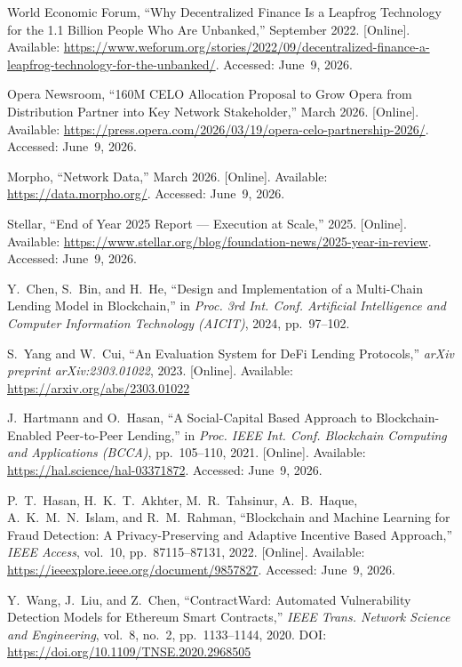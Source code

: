 \documentclass[12pt, a4paper]{report}
\begin{document}
{\begin{enumerate}[label={[\arabic*]}]
\item World Economic Forum, ``Why Decentralized Finance Is a Leapfrog Technology for the 1.1 Billion People Who Are Unbanked,'' September 2022. [Online]. Available: \url{https://www.weforum.org/stories/2022/09/decentralized-finance-a-leapfrog-technology-for-the-unbanked/}. Accessed: June~9, 2026.

\item Opera Newsroom, ``160M CELO Allocation Proposal to Grow Opera from Distribution Partner into Key Network Stakeholder,'' March 2026. [Online]. Available: \url{https://press.opera.com/2026/03/19/opera-celo-partnership-2026/}. Accessed: June~9, 2026.

\item Morpho, ``Network Data,'' March 2026. [Online]. Available: \url{https://data.morpho.org/}. Accessed: June~9, 2026.

\item Stellar, ``End of Year 2025 Report --- Execution at Scale,'' 2025. [Online]. Available: \url{https://www.stellar.org/blog/foundation-news/2025-year-in-review}. Accessed: June~9, 2026.

\item Y.~Chen, S.~Bin, and H.~He, ``Design and Implementation of a Multi-Chain Lending Model in Blockchain,'' in \textit{Proc. 3rd Int. Conf. Artificial Intelligence and Computer Information Technology (AICIT)}, 2024, pp.~97--102.

\item S.~Yang and W.~Cui, ``An Evaluation System for DeFi Lending Protocols,'' \textit{arXiv preprint arXiv:2303.01022}, 2023. [Online]. Available: \url{https://arxiv.org/abs/2303.01022}

\item J.~Hartmann and O.~Hasan, ``A Social-Capital Based Approach to Blockchain-Enabled Peer-to-Peer Lending,'' in \textit{Proc. IEEE Int. Conf. Blockchain Computing and Applications (BCCA)}, pp.~105--110, 2021. [Online]. Available: \url{https://hal.science/hal-03371872}. Accessed: June~9, 2026.

\item P.~T.~Hasan, H.~K.~T.~Akhter, M.~R.~Tahsinur, A.~B.~Haque, A.~K.~M.~N.~Islam, and R.~M.~Rahman, ``Blockchain and Machine Learning for Fraud Detection: A Privacy-Preserving and Adaptive Incentive Based Approach,'' \textit{IEEE Access}, vol.~10, pp.~87115--87131, 2022. [Online]. Available: \url{https://ieeexplore.ieee.org/document/9857827}. Accessed: June~9, 2026.

\item Y.~Wang, J.~Liu, and Z.~Chen, ``ContractWard: Automated Vulnerability Detection Models for Ethereum Smart Contracts,'' \textit{IEEE Trans. Network Science and Engineering}, vol.~8, no.~2, pp.~1133--1144, 2020. DOI: \url{https://doi.org/10.1109/TNSE.2020.2968505}


\end{enumerate}}
\end{document}
